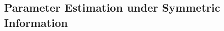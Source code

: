 \documentclass[11pt]{article}
\DeclareMathOperator*{\argmax}{arg\,max}
\theoremstyle{definition}
\theoremstyle{definition}
\begin{document}
\subsection{Parameter Estimation under Symmetric Information}
\end{document}
